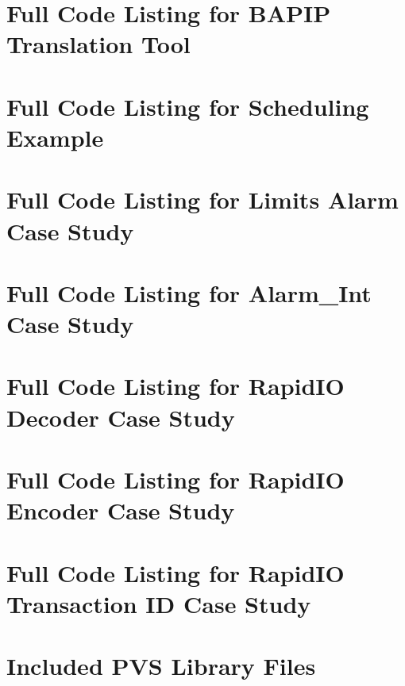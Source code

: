 \begin{singlespace}

\chapter{Full Code Listing for BAPIP Translation Tool} \label{app:bapipsrc}


\chapter{Full Code Listing for Scheduling Example} \label{app:schedex}


\chapter{Full Code Listing for Limits Alarm Case Study} \label{app:limits}


\chapter{Full Code Listing for Alarm\_Int Case Study} \label{app:alarm}


\chapter{Full Code Listing for RapidIO Decoder Case Study} \label{app:decode}


\chapter{Full Code Listing for RapidIO Encoder Case Study} \label{app:encode}


\chapter{Full Code Listing for RapidIO Transaction ID Case Study} \label{app:tid}


\chapter{Included PVS Library Files} \label{app:schedex:pvslib}


\end{singlespace}
